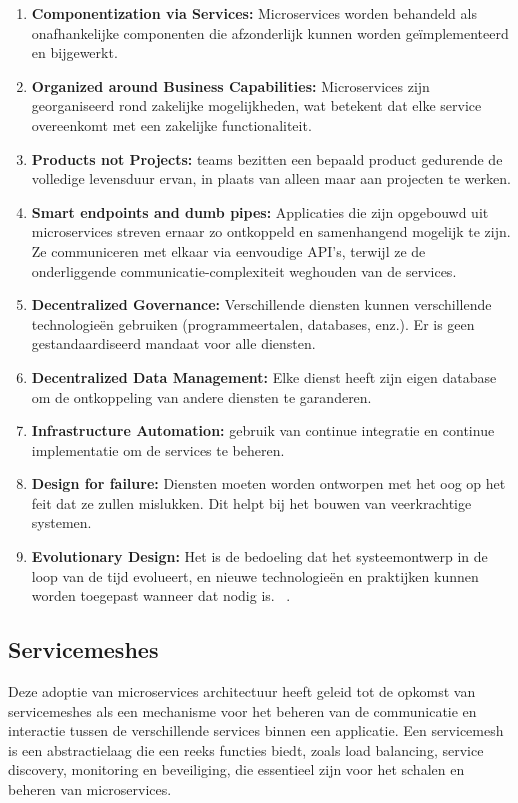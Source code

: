 \begin{enumerate}
	\item \textbf{Componentization via Services:} Microservices worden behandeld als onafhankelijke componenten die afzonderlijk kunnen worden geïmplementeerd en bijgewerkt.
	
	\item \textbf{Organized around Business Capabilities:} Microservices zijn georganiseerd rond zakelijke mogelijkheden, wat betekent dat elke service overeenkomt met een zakelijke functionaliteit.
	
	\item \textbf{Products not Projects:} teams bezitten een bepaald product gedurende de volledige levensduur ervan, in plaats van alleen maar aan projecten te werken.
	
	\item \textbf{Smart endpoints and dumb pipes:} Applicaties die zijn opgebouwd uit microservices streven ernaar zo ontkoppeld en samenhangend mogelijk te zijn. Ze communiceren met elkaar via eenvoudige API’s, terwijl ze de onderliggende communicatie-complexiteit \linebreak  weghouden van de services. 
	
	\item \textbf{Decentralized Governance:} Verschillende diensten kunnen verschillende technologieën gebruiken (programmeertalen, databases, enz.). Er is geen gestandaardiseerd mandaat voor alle diensten.
	
	\item \textbf{Decentralized Data Management:} Elke dienst heeft zijn eigen database om de ontkoppeling van andere diensten te garanderen.
	
	\item \textbf{Infrastructure Automation:} gebruik van continue integratie en continue implementatie om de services te beheren.
	
	\item \textbf{Design for failure:} Diensten moeten worden ontworpen met het oog op het feit dat ze zullen mislukken. Dit helpt bij het bouwen van veerkrachtige systemen.
	
	\item \textbf{Evolutionary Design:} Het is de bedoeling dat het systeemontwerp in de loop van de tijd evolueert, en nieuwe technologieën en praktijken kunnen worden toegepast wanneer dat nodig is. ~\autocite{Fowler2014}.
\end{enumerate}

\subsection*{Servicemeshes}
Deze adoptie van microservices architectuur heeft geleid tot de opkomst van servicemeshes als een mechanisme voor het beheren van de communicatie en interactie tussen de verschillende services binnen een applicatie. Een servicemesh is een abstractielaag die een reeks functies biedt, zoals load balancing, service discovery, monitoring en beveiliging, die essentieel zijn voor het schalen en beheren van microservices.

